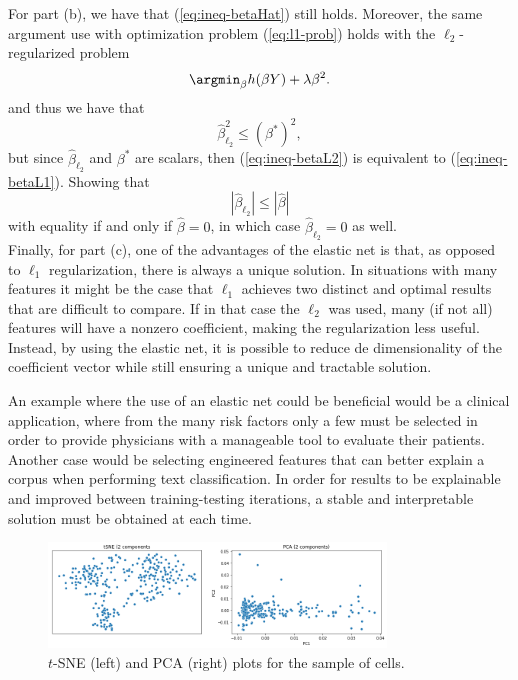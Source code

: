 \documentclass[11pt, english, twocolumn]{article}
\begin{document}
For part (b), we have that (\ref{eq:ineq-betaHat}) still holds. Moreover, the same argument use with optimization problem (\ref{eq:l1-prob}) holds with the $\ell_{2}$-regularized problem
	\begin{equation} \label{eq:l2-prob}
		\argmin_{\beta} h(\beta Y) + \lambda \beta^{2}.
	\end{equation}
and thus we have that
	\begin{equation}\label{eq:ineq-betaL2}
		\hat{\beta}_{\ell_{2}}^{2} \leq (\beta^{*})^{2},
	\end{equation}
but since $\hat{\beta}_{\ell_{2}}$ and $\beta^{*}$ are scalars, then (\ref{eq:ineq-betaL2}) is equivalent to (\ref{eq:ineq-betaL1}). Showing that
	$$\left|\hat{\beta}_{\ell_{2}}\right| \leq \left|\hat{\beta}\right|$$
with equality if and only if $\hat{\beta} = 0$, in which case $\hat{\beta}_{\ell_{2}} = 0$ as well.\\[1ex]

Finally, for part (c), one of the advantages of the elastic net is that, as opposed to $\ell_{1}$ regularization, there is always a unique solution. In situations with many features it might be the case that $\ell_{1}$ achieves two distinct and optimal results that are difficult to compare. If in that case the $\ell_{2}$ was used, many (if not all) features will have a nonzero coefficient, making the regularization less useful. Instead, by using the elastic net, it is possible to reduce de dimensionality of the coefficient vector while still ensuring a unique and tractable solution.

An example where the use of an elastic net could be beneficial would be a clinical application, where from the many risk factors only a few must be selected in order to provide physicians with a manageable tool to evaluate their patients. Another case would be selecting engineered features that can better explain a corpus when performing text classification. In order for results to be explainable and improved between training-testing iterations, a stable and interpretable solution must be obtained at each time.

\begin{figure}[b]
	\centering
	\includegraphics[width=0.8\textwidth]{tSNE-PCA}
	\caption{$t$-SNE (left) and PCA (right) plots for the sample of cells.}
	\label{fig:tSNE-PCA}
\end{figure}
\end{document}
